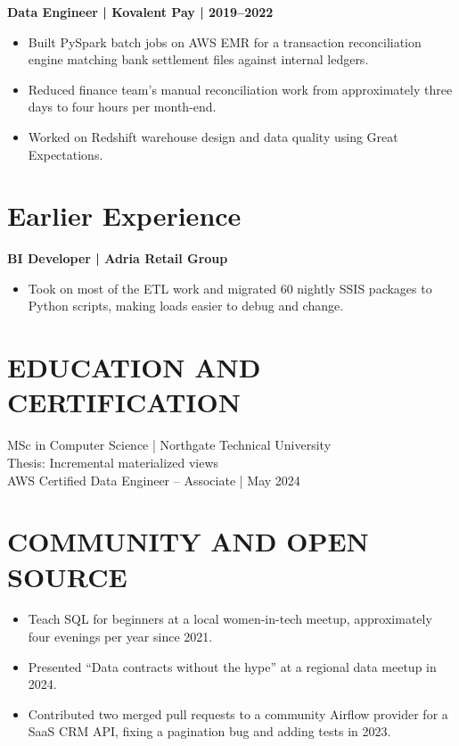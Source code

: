 \documentclass[11pt,a4paper]{article}
\begin{document}
\textbf{Data Engineer | Kovalent Pay | 2019–2022}
\begin{itemize}
\item Built PySpark batch jobs on AWS EMR for a transaction reconciliation engine matching bank settlement files against internal ledgers.
\item Reduced finance team's manual reconciliation work from approximately three days to four hours per month-end.
\item Worked on Redshift warehouse design and data quality using Great Expectations.
\end{itemize}

\section*{Earlier Experience}
\textbf{BI Developer | Adria Retail Group}
\begin{itemize}
\item Took on most of the ETL work and migrated 60 nightly SSIS packages to Python scripts, making loads easier to debug and change.
\end{itemize}

\section*{EDUCATION AND CERTIFICATION}
MSc in Computer Science | Northgate Technical University\\
Thesis: Incremental materialized views\\
AWS Certified Data Engineer – Associate | May 2024

\section*{COMMUNITY AND OPEN SOURCE}
\begin{itemize}
\item Teach SQL for beginners at a local women-in-tech meetup, approximately four evenings per year since 2021.
\item Presented “Data contracts without the hype” at a regional data meetup in 2024.
\item Contributed two merged pull requests to a community Airflow provider for a SaaS CRM API, fixing a pagination bug and adding tests in 2023.
\end{itemize}
\end{document}
